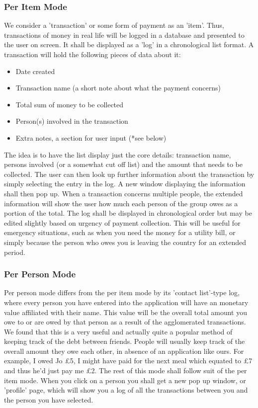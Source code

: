 \documentclass[a4paper,9t]{article}
\begin{document}
\subsubsection*{Per Item Mode}
We consider a 'transaction' or some form of payment as an 'item'. Thus, transactions of money in real life will be logged in a database and presented to the user on screen. It shall be displayed as a 'log' in a chronological list format. 
A transaction will hold the following pieces of data about it:
\begin{itemize}
\item{Date created}
\item{Transaction name (a short note about what the payment concerns)}
\item{Total sum of money to be collected}
\item{Person(s) involved in the transaction}
\item{Extra notes, a section for user input (*see below)}
\end{itemize}
The idea is to have the list display just the core details: transaction name, persons involved (or a somewhat cut off list) and the amount that needs to be collected. The user can then look up further information about the transaction by simply selecting the entry in the log. A new window displaying the information shall then pop up. When a transaction concerns multiple people, the extended information will show the user how much each person of the group owes as a portion of the total.
The log shall be displayed in chronological order but may be edited slightly based on urgency of payment collection. This will be useful for emergency situations, such as when you need the money for a utility bill, or simply because the person who owes you is leaving the country for an extended period.

\subsubsection*{Per Person Mode}
Per person mode differs from the per item mode by its 'contact list'-type log, where every person you have entered into the application will have an monetary value affiliated with their name. This value will be the overall total amount you owe to or are owed by that person as a result of the agglomerated transactions. 
We found that this is a very useful and actually quite a popular method of keeping track of the debt between friends. People will usually keep track of the overall amount they owe each other, in absence of an application like ours. For example, I owed Jo £5, I might have paid for the next meal which equated to £7 and thus he'd just pay me £2. 
The rest of this mode shall follow suit of the per item mode. When you click on a person you shall get a new pop up window, or 'profile' page, which will show you a log of all the transactions between you and the person you have selected.
\end{document}
